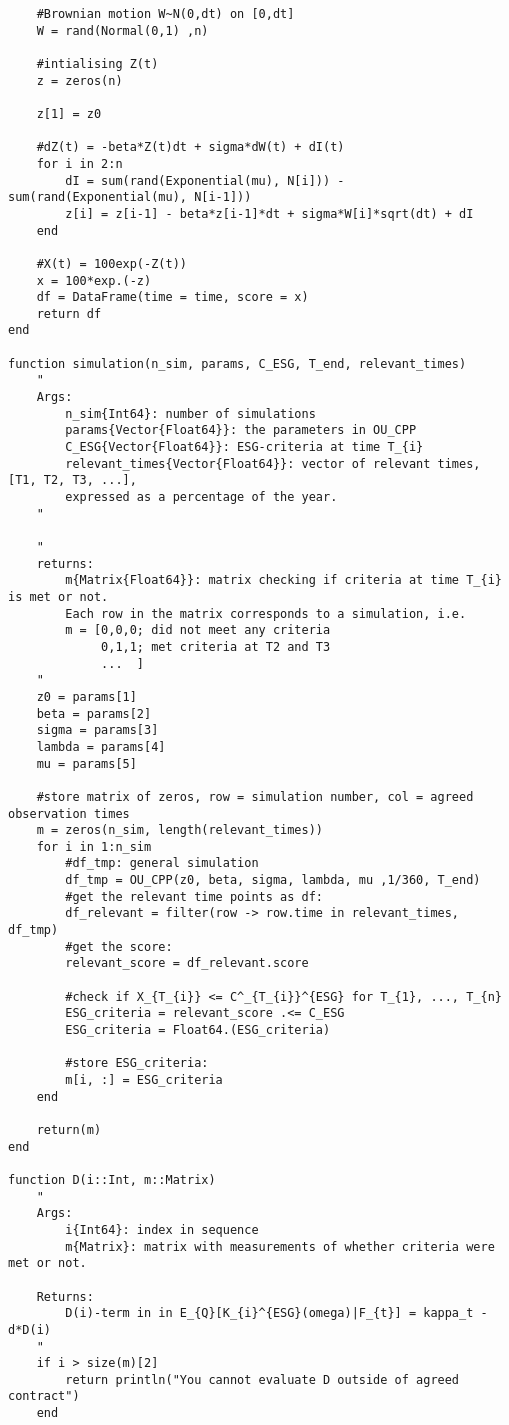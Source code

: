 \begin{verbatim}
    #Brownian motion W~N(0,dt) on [0,dt]
    W = rand(Normal(0,1) ,n)

    #intialising Z(t)
    z = zeros(n)

    z[1] = z0

    #dZ(t) = -beta*Z(t)dt + sigma*dW(t) + dI(t)
    for i in 2:n 
        dI = sum(rand(Exponential(mu), N[i])) - sum(rand(Exponential(mu), N[i-1]))
        z[i] = z[i-1] - beta*z[i-1]*dt + sigma*W[i]*sqrt(dt) + dI
    end

    #X(t) = 100exp(-Z(t))
    x = 100*exp.(-z)
    df = DataFrame(time = time, score = x)
    return df
end

function simulation(n_sim, params, C_ESG, T_end, relevant_times)
    "
    Args:
        n_sim{Int64}: number of simulations 
        params{Vector{Float64}}: the parameters in OU_CPP
        C_ESG{Vector{Float64}}: ESG-criteria at time T_{i}            
        relevant_times{Vector{Float64}}: vector of relevant times, [T1, T2, T3, ...],
        expressed as a percentage of the year.
    "

    "
    returns:
        m{Matrix{Float64}}: matrix checking if criteria at time T_{i} is met or not.
        Each row in the matrix corresponds to a simulation, i.e.
        m = [0,0,0; did not meet any criteria
             0,1,1; met criteria at T2 and T3
             ...  ] 
    "
    z0 = params[1]
    beta = params[2]
    sigma = params[3]
    lambda = params[4]
    mu = params[5]

    #store matrix of zeros, row = simulation number, col = agreed observation times
    m = zeros(n_sim, length(relevant_times))
    for i in 1:n_sim
        #df_tmp: general simulation 
        df_tmp = OU_CPP(z0, beta, sigma, lambda, mu ,1/360, T_end)
        #get the relevant time points as df:
        df_relevant = filter(row -> row.time in relevant_times, df_tmp)
        #get the score:
        relevant_score = df_relevant.score
    
        #check if X_{T_{i}} <= C^_{T_{i}}^{ESG} for T_{1}, ..., T_{n}
        ESG_criteria = relevant_score .<= C_ESG 
        ESG_criteria = Float64.(ESG_criteria)
        
        #store ESG_criteria:
        m[i, :] = ESG_criteria
    end

    return(m)
end

function D(i::Int, m::Matrix)
    " 
    Args:
        i{Int64}: index in sequence 
        m{Matrix}: matrix with measurements of whether criteria were met or not. 

    Returns: 
        D(i)-term in in E_{Q}[K_{i}^{ESG}(omega)|F_{t}] = kappa_t - d*D(i)    
    "
    if i > size(m)[2]
        return println("You cannot evaluate D outside of agreed contract")
    end
    

\end{verbatim}
